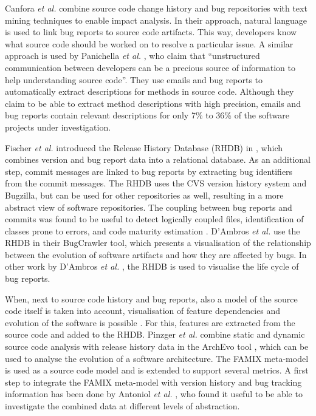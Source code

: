 Canfora \emph{et al.} \cite{Canfora2006a} combine source code change history and bug repositories with text mining techniques to enable impact analysis. In their approach, natural language is used to link bug reports to source code artifacts. This way, developers know what source code should be worked on to resolve a particular issue. A similar approach is used by Panichella \emph{et al.} \cite{Panichella2012}, who claim that ``unstructured communication between developers can be a precious source of information to help understanding source code''. They use emails and bug reports to automatically extract descriptions for methods in source code. Although they claim to be able to extract method descriptions with high precision, emails and bug reports contain relevant descriptions for only 7\% to 36\% of the software projects under investigation. 

Fischer \emph{et al.} introduced the Release History Database (RHDB) in \cite{Fischer}, which combines version and bug report data into a relational database. As an additional step, commit messages are linked to bug reports by extracting bug identifiers from the commit messages. The RHDB uses the CVS version history system and Bugzilla, but can be used for other repositories as well, resulting in a more abstract view of software repositories. The coupling between bug reports and commits was found to be useful to detect logically coupled files, identification of classes prone to errors, and code maturity estimation \cite{Fischer,Fischer2003}. D'Ambros \emph{et al.} \cite{D'Ambros2006} use the RHDB in their BugCrawler tool, which presents a visualisation of the relationship between the evolution of software artifacts and how they are affected by bugs. In other work by D'Ambros \emph{et al.} \cite{D'Ambros2007}, the RHDB is used to visualise the life cycle of bug reports.

When, next to source code history and bug reports, also a model of the source code itself is taken into account, visualisation of feature dependencies and evolution of the software is possible \cite{Fischer2004}. For this, features are extracted from the source code and added to the RHDB. Pinzger \emph{et al.} combine static and dynamic source code analysis with release history data in the ArchEvo tool \cite{Pinzger2005}, which can be used to analyse the evolution of a software architecture. The FAMIX meta-model \cite{Tichelaar2001,Tichelaar2000} is used as a source code model and is extended to support several metrics. A first step to integrate the FAMIX meta-model with version history and bug tracking information has been done by Antoniol \emph{et al.} \cite{Antoniol2005}, who found it useful to be able to investigate the combined data at different levels of abstraction.

